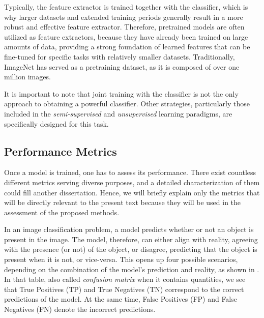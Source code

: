 Typically, the feature extractor is trained together with the classifier, which is why larger datasets and extended training periods generally result in a more robust and effective feature extractor. Therefore, pretrained models are often utilized as feature extractors, because they have already been trained on large amounts of data, providing a strong foundation of learned features that can be fine-tuned for specific tasks with relatively smaller datasets. Traditionally, ImageNet has served as a pretraining dataset, as it is composed of over one million images.

It is important to note that joint training with the classifier is not the only approach to obtaining a powerful classifier. Other strategies, particularly those included in the \textit{semi-supervised} and \textit{unsupervised} learning paradigms, are specifically designed for this task.

\subsection{Performance Metrics}\label{subsec:perf_metrics}

Once a model is trained, one has to assess its performance. There exist countless different metrics serving diverse purposes, and a detailed characterization of them could fill another dissertation. Hence, we will briefly explain only the metrics that will be directly relevant to the present text because they will be used in the assessment of the proposed methods.

In an image classification problem, a model predicts whether or not an object is present in the image. The model, therefore, can either align with reality, agreeing with the presence (or not) of the object, or disagree, predicting that the object is present when it is not, or vice-versa. This opens up four possible scenarios, depending on the combination of the model's prediction and reality, as shown in . In that table, also called \textit{confusion matrix} when it contains quantities, we see that True Positives (TP) and True Negatives (TN) correspond to the correct predictions of the model. At the same time, False Positives (FP) and False Negatives (FN) denote the incorrect predictions.

